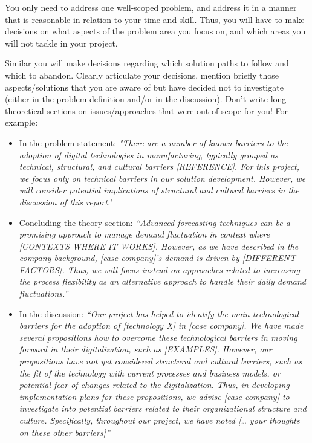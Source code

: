 \documentclass[
]{book}
\begin{document}
You only need to address one well-scoped problem, and address it in a manner that
is reasonable in relation to your time and skill. Thus, you will
have to make decisions on what aspects of the problem area you
focus on, and which areas you will not tackle in your project.

Similar you will make decisions regarding which solution paths to
follow and which to abandon. Clearly articulate your decisions,
mention briefly those aspects/solutions that you are aware of but
have decided not to investigate (either in the problem definition
and/or in the discussion). Don't write long theoretical sections
on issues/approaches that were out of scope for you! For example:

\begin{itemize}
\item
  In the problem statement: \emph{"There are a number of known barriers to the adoption of digital technologies in manufacturing, typically grouped as technical, structural, and cultural barriers {[}REFERENCE{]}. For this project, we focus only on technical barriers in our solution development. However, we will consider potential implications of structural and cultural barriers in the discussion of this report.}"
\item
  Concluding the theory section: \emph{``Advanced forecasting techniques can be a promising approach to manage demand fluctuation in context where {[}CONTEXTS WHERE IT WORKS{]}. However, as we have described in the company background, {[}case company{]}'s demand is driven by {[}DIFFERENT FACTORS{]}. Thus, we will focus instead on approaches related to increasing the process flexibility as an alternative approach to handle their daily demand fluctuations.''}
\item
  In the discussion: \emph{``Our project has helped to identify the main technological barriers for the adoption of {[}technology X{]} in {[}case company{]}. We have made several propositions how to overcome these technological barriers in moving forward in their digitalization, such as {[}EXAMPLES{]}. However, our propositions have not yet considered structural and cultural barriers, such as the fit of the technology with current processes and business models, or potential fear of changes related to the digitalization. Thus, in developing implementation plans for these propositions, we advise {[}case company{]} to investigate into potential barriers related to their organizational structure and culture. Specifically, throughout our project, we have noted {[}\ldots{} your thoughts on these other barriers{]}''}
\end{itemize}
\end{document}
